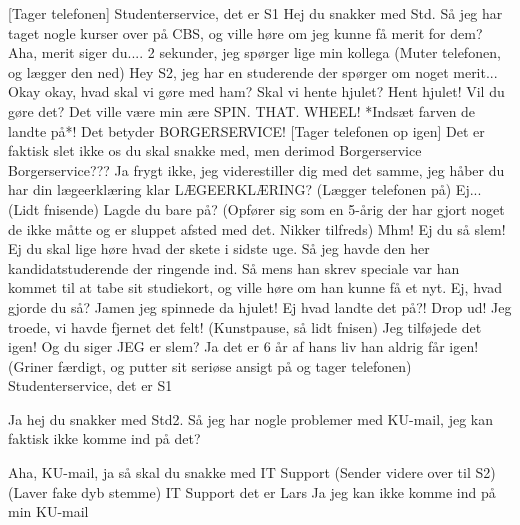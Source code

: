 \documentclass[a4paper,11pt]{article}
\begin{document}
\begin{sketch}

[Tager telefonen] Studenterservice, det er S1
 Hej du snakker med Std. Så jeg har taget nogle kurser over på CBS,
og ville høre om jeg kunne få merit for dem?
 Aha, merit siger du.... 2 sekunder, jeg spørger lige min kollega (Muter
telefonen, og lægger den ned)
 Hey S2, jeg har en studerende der spørger om noget merit...
 Okay okay, hvad skal vi gøre med ham?
 Skal vi hente hjulet?
 Hent hjulet!
 Vil du gøre det?
 Det ville være min ære
 SPIN. THAT. WHEEL!
 *Indsæt farven de landte på*! Det betyder
 BORGERSERVICE!
[Tager telefonen op igen] Det er faktisk slet ikke os du skal snakke med, men derimod Borgerservice
 Borgerservice???
 Ja frygt ikke, jeg viderestiller dig med det samme, jeg håber du har
din lægeerklæring klar
 LÆGEERKLÆRING?
 (Lægger telefonen på)
 Ej... (Lidt fnisende) Lagde du bare på?
 (Opfører sig som en 5-årig der har gjort noget de ikke måtte og er
sluppet afsted med det. Nikker tilfreds) Mhm!
 Ej du så slem! Ej du skal lige høre hvad der skete i sidste uge. Så jeg havde den her kandidatstuderende der ringende ind. Så mens han
skrev speciale var han kommet til at tabe sit studiekort, og ville høre om han kunne få et nyt.
 Ej, hvad gjorde du så?
 Jamen jeg spinnede da hjulet!
 Ej hvad landte det på?!
 Drop ud!
 Jeg troede, vi havde fjernet det felt!
 (Kunstpause, så lidt fnisen) Jeg tilføjede det igen!
 Og du siger JEG er slem?
 Ja det er 6 år af hans liv han aldrig får igen!
(Griner færdigt, og putter sit seriøse ansigt på og tager telefonen)
Studenterservice, det er S1

 Ja hej du snakker med Std2. Så jeg har nogle problemer med KU-mail, jeg kan faktisk ikke komme ind på det?

 Aha, KU-mail, ja så skal du snakke med IT Support (Sender videre
over til S2)
 (Laver fake dyb stemme) IT Support det er Lars
 Ja jeg kan ikke komme ind på min KU-mail


\end{sketch}
\end{document}
